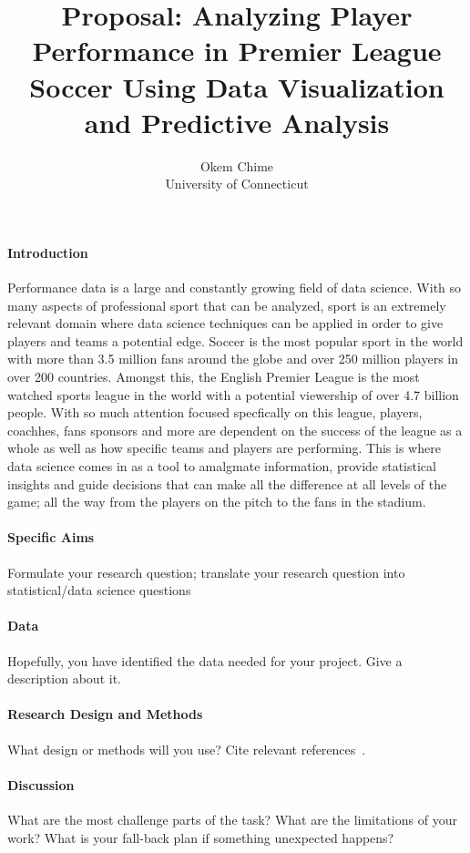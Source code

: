 \documentclass[12pt]{article}
\title{Proposal: Analyzing Player Performance in Premier League Soccer Using 
Data Visualization and Predictive Analysis }
\author{Okem Chime\\
  University of Connecticut
}
\begin{document}
\maketitle

\paragraph{Introduction}
Performance data is a large and constantly growing field of data science. With
so many aspects of professional sport that can be analyzed, sport is an 
extremely relevant domain where data science techniques can be applied in order
to give players and teams a potential edge. Soccer is the most popular sport in
the world with more than 3.5 million fans around the globe and over 250 million
players in over 200 countries. Amongst this, the English Premier League is the 
most watched sports league in the world with a potential viewership of over 4.7 
billion people. With so much attention focused specfically on this league,
players, coachhes, fans sponsors and more are dependent on the success of the
league as a whole as well as how specific teams and players are performing. 
This is where data science comes in as a tool to amalgmate information,
provide statistical insights and guide decisions that can make all the difference 
at all levels of the game; all the way from the players on the pitch to the fans
in the stadium.


\paragraph{Specific Aims}
Formulate your research question;
translate your research question into statistical/data science questions


\paragraph{Data}
Hopefully, you have identified the data needed for your project. Give a
description about it.



\paragraph{Research Design and Methods}
What design or methods will you use?
Cite relevant references~\citep[e.g.,][]{wild2004global}.



\paragraph{Discussion}
What are the most challenge parts of the task?
What are the limitations of your work? What is your fall-back plan if
something unexpected happens?





\end{document}
